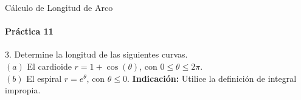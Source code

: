 \documentclass{plantillaPPT}
\begin{document}
\begin{frame}{Cálculo de Longitud de Arco}
\framesubtitle{Práctica 11}

3. Determine la longitud de las siguientes curvas. \\[5ex]

\((a)\) El cardioide \(r=1+\cos(\theta)\), con \(0\leq\theta\leq2\pi\).\\[3ex]
\((b)\) El espiral \(r = e^\theta\), con \(\theta\leq0\). \textbf{Indicación:} Utilice la definición de integral impropia.

\end{frame}
\end{document}
